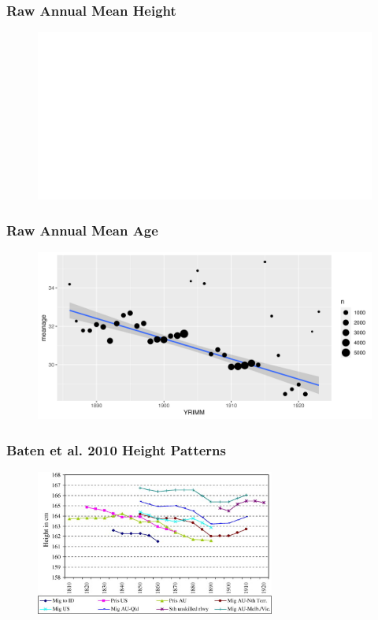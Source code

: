 \documentclass[xcolor=dvipsnames, compress, 12pt, aspectratio=169, handout]{beamer}
\begin{document}
\appendix 
\begin{frame}
    \label{heightplot1}
    \frametitle{Raw Annual Mean Height \hyperlink{height}{}}
    \begin{figure}
        \centering
        \includegraphics[width=\textwidth]{../../figs/5oct23/heightplot1.png}
    \end{figure}
\end{frame}

\begin{frame}
    \label{ageplot1}
    \frametitle{Raw Annual Mean Age \hyperlink{height}{}}
    \begin{figure}
        \centering
        \includegraphics[width=\textwidth]{../../figs/5oct23/ageplot1.png}
    \end{figure}
\end{frame}

\begin{frame}
    \frametitle{Baten et al. 2010 Height Patterns \hyperlink{height}{}}
    \label{batenheight}
    \begin{figure}
        \centering
        \includegraphics[width=0.7\textwidth]{../../figs/5oct23/batenetal2010_height.jpg}
    \end{figure}
\end{frame}
\end{document}
